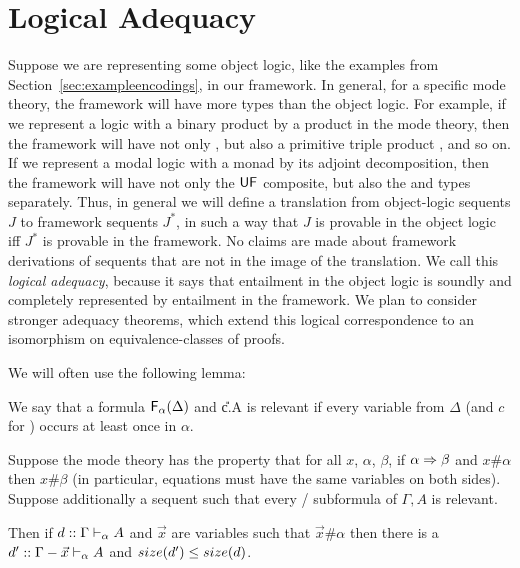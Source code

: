

\section{Logical Adequacy}
\label{sec:adequacy-long}

Suppose we are representing some object logic, like the examples from
Section~\ref{sec:exampleencodings}, in our framework.  In general, for a
specific mode theory, the framework will have more types than the object
logic.  For example, if we represent a logic with a binary product by a
product in the mode theory, then the framework will have not only , but also a primitive triple product , and so on.  If we represent a modal logic
with a monad by its adjoint decomposition, then the framework will have
not only the $\mathsf{U} \mathsf{F}$ composite, but also the \Usymb\/ and
\Fsymb\/ types separately.  Thus, in general we will define a
translation from object-logic sequents $J$ to framework sequents $J^*$,
in such a way that $J$ is provable in the object logic iff $J^*$ is
provable in the framework.  No claims are made about framework
derivations of sequents that are not in the image of the translation.
We call this \emph{logical adequacy}, because it says that entailment in
the object logic is soundly and completely represented by entailment in
the framework.  We plan to consider stronger adequacy theorems, which
extend this logical correspondence to an isomorphism on
equivalence-classes of proofs.

We will often use the following lemma:  

\begin{lemma} \label{lem:0-use-strengthening}
We say that a formula $\mathsf{F}_{\alpha}(\Delta)$ and \U{c.\alpha}{\Delta}{A}
is relevant if every variable from $\Delta$ (and $c$ for \Usymb) occurs
at least once in $\alpha$.

Suppose the mode theory has the property that for all $x$, $\alpha$,
$\beta$, if $\alpha \Rightarrow \beta$ and $x \# \alpha$ then $x \# \beta$ (in
particular, equations must have the same variables on both sides).
Suppose additionally a sequent  such that every
\Fsymb/\Usymb\/ subformula of $\Gamma,A$ is relevant.

Then if $d :: \Gamma \vdash_{\alpha} A$ and $\vec{x}$ are variables such
that $\vec{x} \# \alpha$ then there is a $d' ::
\Gamma-\vec{x} \vdash_{\alpha} A$ and $size(d') \le size(d)$.
\end{lemma}


